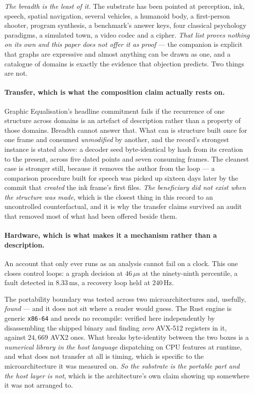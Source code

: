 \documentclass[11pt,a4paper]{article}
\begin{document}
\emph{The breadth is the least of it.} The substrate has been pointed at perception, ink, speech,
spatial navigation, several vehicles, a humanoid body, a first-person shooter, program synthesis, a
benchmark's answer keys, four classical psychology paradigms, a simulated town, a video codec and a
cipher. \emph{That list proves nothing on its own and this paper does not offer it as proof} --- the
companion is explicit that graphs are expressive and almost anything can be drawn as one, and a
catalogue of domains is exactly the evidence that objection predicts. Two things are not.

\paragraph{Transfer, which is what the composition claim actually rests on.}
Graphic Equalisation's headline commitment fails if the recurrence of one structure across domains is an
artefact of description rather than a property of those domains. Breadth cannot answer that. What can
is structure built once for one frame and consumed \emph{unmodified} by another, and the record's
strongest instance is stated above: a decoder seed byte-identical by hash from its creation to the
present, across five dated points and seven consuming frames. The cleanest case is stronger still,
because it removes the author from the loop --- a comparison procedure built for speech was picked up
sixteen days later by the commit that \emph{created} the ink frame's first files. \emph{The beneficiary
did not exist when the structure was made}, which is the closest thing in this record to an
uncontrolled counterfactual, and it is why the transfer claims survived an audit that removed most of
what had been offered beside them.

\paragraph{Hardware, which is what makes it a mechanism rather than a description.}
An account that only ever runs as an analysis cannot fail on a clock. This one closes control loops:
a graph decision at $46\,\mu\mathrm{s}$ at the ninety-ninth percentile, a fault detected in
$8.33\,\mathrm{ms}$, a recovery loop held at $240\,\mathrm{Hz}$.

The portability boundary was tested across two microarchitectures and, usefully, \emph{found} --- and it
does not sit where a reader would guess. The Rust engine is generic \texttt{x86-64} and needs no
recompile: verified here independently by disassembling the shipped binary and finding \emph{zero}
AVX-512 registers in it, against $24{,}669$ AVX2 ones. What breaks byte-identity between the two boxes
is a \emph{numerical library in the host language} dispatching on CPU features at runtime, and what
does not transfer at all is timing, which is specific to the microarchitecture it was measured on.
\emph{So the substrate is the portable part and the host layer is not}, which is the architecture's own
claim showing up somewhere it was not arranged to.
\end{document}
